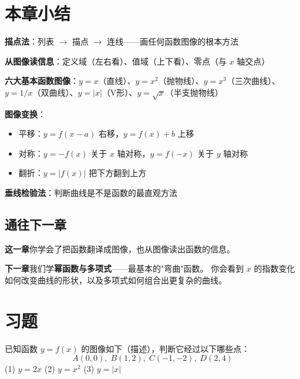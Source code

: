 \section{本章小结}

\begin{progressbox}
\textbf{描点法}：列表 \(\rightarrow\) 描点 \(\rightarrow\) 连线——画任何函数图像的根本方法

\textbf{从图像读信息}：定义域（左右看）、值域（上下看）、零点（与 \(x\) 轴交点）

\textbf{六大基本函数图像}：\(y=x\)（直线）、\(y=x^2\)（抛物线）、\(y=x^3\)（三次曲线）、
\(y=1/x\)（双曲线）、\(y=|x|\)（V形）、\(y=\sqrt{x}\)（半支抛物线）

\textbf{图像变换}：
\begin{itemize}
  \item 平移：\(y = f(x-a)\) 右移，\(y = f(x)+b\) 上移
  \item 对称：\(y = -f(x)\) 关于 \(x\) 轴对称，\(y = f(-x)\) 关于 \(y\) 轴对称
  \item 翻折：\(y = |f(x)|\) 把下方翻到上方
\end{itemize}

\textbf{垂线检验法}：判断曲线是不是函数的最直观方法
\end{progressbox}

\subsection*{通往下一章}

\textbf{这一章}你学会了把函数翻译成图像，也从图像读出函数的信息。

\textbf{下一章}我们学\textbf{幂函数与多项式}——最基本的"弯曲"函数。
你会看到 \(x\) 的指数变化如何改变曲线的形状，以及多项式如何组合出更复杂的曲线。


\section{习题}


\begin{exercise}[0]
已知函数 \(y = f(x)\) 的图像如下（描述），判断它经过以下哪些点：
\[
A(0,0),\; B(1,2),\; C(-1,-2),\; D(2,4)
\]
(1) \(y = 2x\) \quad (2) \(y = x^2\) \quad (3) \(y = |x|\)
\end{exercise}


